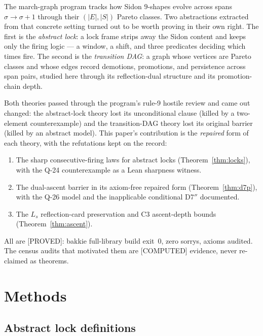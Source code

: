 \documentclass[11pt,a4paper]{article}
\theoremstyle{definition}
\begin{document}
The march-graph program tracks how Sidon $9$-shapes evolve across spans
$\sigma\to\sigma+1$ through their $(|E|,|S|)$ Pareto classes. Two
abstractions extracted from that concrete setting turned out to be
worth proving in their own right. The first is the \emph{abstract lock}:
a lock frame strips away the Sidon content and keeps only the firing
logic --- a window, a shift, and three predicates deciding which times
fire. The second is the \emph{transition DAG}: a graph whose vertices
are Pareto classes and whose edges record demotions, promotions, and
persistence across span pairs, studied here through its reflection-dual
structure and its promotion-chain depth.

Both theories passed through the program's rule-9 hostile review and
came out changed: the abstract-lock theory lost its unconditional
clause (killed by a two-element counterexample) and the transition-DAG
theory lost its original barrier (killed by an abstract model). This
paper's contribution is the \emph{repaired} form of each theory, with
the refutations kept on the record:
\begin{enumerate}
\item The sharp consecutive-firing laws for abstract locks
  (Theorem~\ref{thm:locks}), with the Q-24 counterexample as a Lean
  sharpness witness.
\item The dual-ascent barrier in its axiom-free repaired form
  (Theorem~\ref{thm:d7p}), with the Q-26 model and the inapplicable
  conditional D7$''$ documented.
\item The $L_s$ reflection-card preservation and C3 ascent-depth
  bounds (Theorem~\ref{thm:ascent}).
\end{enumerate}
All are [PROVED]: bakkie full-library build exit~$0$, zero sorrys,
axioms audited. The census audits that motivated them are [COMPUTED]
evidence, never re-claimed as theorems.

\section{Methods}

\subsection{Abstract lock definitions}
\end{document}
